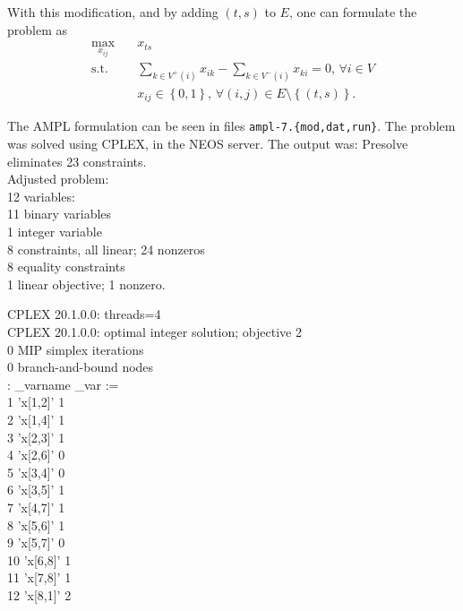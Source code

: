 \documentclass[a4paper]{report}
\newenvironment{alltt}{\ttfamily}{\par}
\begin{document}
With this modification, and by adding $\left( t,s \right) $ to $E$, one can formulate the problem as
\begin{align*}
    \max_{x_{ij}} \quad & x_{ts} \\
    \textrm{s.t.} \quad & \sum_{k \in V^{+}\left( i \right) }x_{ik} - \sum_{k\in V^{-}\left( i \right) } x_{ki} = 0,\, \forall i\in V \\
      & x_{ij}\in \left\{ 0,1 \right\} ,\,\forall \left( i,j \right) \in E\setminus \left\{ \left( t,s \right)  \right\}
.\end{align*}

The AMPL formulation can be seen in files \texttt{ampl-7.\{mod,dat,run\}}. The problem was solved using CPLEX, in the NEOS server. The output was:
\begin{alltt}
Presolve eliminates 23 constraints. \\
Adjusted problem: \\
12 variables: \\
\-\hspace{2cm}11 binary variables \\
\-\hspace{2cm}1 integer variable \\
8 constraints, all linear; 24 nonzeros \\
\-\hspace{2cm}8 equality constraints \\
1 linear objective; 1 nonzero.

CPLEX 20.1.0.0: threads=4 \\
CPLEX 20.1.0.0: optimal integer solution; objective 2 \\
0 MIP simplex iterations \\
0 branch-and-bound nodes \\
:    \_varname \_var    := \\
1    'x[1,2]'   1 \\
2    'x[1,4]'   1 \\
3    'x[2,3]'   1 \\
4    'x[2,6]'   0 \\
5    'x[3,4]'   0 \\
6    'x[3,5]'   1 \\
7    'x[4,7]'   1 \\
8    'x[5,6]'   1 \\
9    'x[5,7]'   0 \\
10   'x[6,8]'   1 \\
11   'x[7,8]'   1 \\
12   'x[8,1]'   2
\end{alltt}
\end{document}
